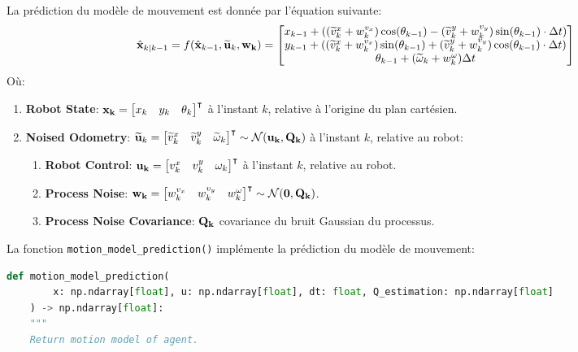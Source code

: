 \documentclass[../CSC_5RO12_TA_TP3.tex]{subfiles}
\begin{document}
\begin{definition}
    La prédiction du modèle de mouvement est donnée par l'équation suivante:
    \begin{equation}
        \hat{\bf{x}}_{k|k-1} = f(\hat{\bf{x}}_{k-1}, \widetilde{\bf{u}}_{k}, \bf{w}_{k}) = \begin{bmatrix}
            x_{k-1} + ((\widetilde{v}^{x}_{k} + w^{v_{x}}_{k}) \cos(\theta_{k-1}) - (\widetilde{v}^{y}_{k} + w^{v_{y}}_{k}) \sin(\theta_{k-1}) \cdot \Delta t )\\
            y_{k-1} + ((\widetilde{v}^{x}_{k} + w^{v_{x}}_{k}) \sin(\theta_{k-1}) + (\widetilde{v}^{y}_{k} + w^{v_{y}}_{k}) \cos(\theta_{k-1}) \cdot \Delta t )\\
            \theta_{k-1} + (\widetilde{\omega}_{k} + w^{\omega}_{k}) \Delta t\\
        \end{bmatrix}
    \end{equation}
    Où:
    \begin{enumerate}[noitemsep]
        \item \textbf{Robot State}: $\bf{x}_{k} = \begin{bmatrix} x_{k} & y_{k} & \theta_{k} \end{bmatrix}^{\intercal}$ à l'instant $k$, relative à l'origine du plan cartésien.
        \item \textbf{Noised Odometry}: $\widetilde{\bf{u}}_{k} = \begin{bmatrix} \widetilde{v}^{x}_{k} & \widetilde{v}^{y}_{k} & \widetilde{\omega}_{k} \end{bmatrix}^{\intercal} \sim \mathcal{N}(\bf{u}_{k}, \bf{Q}_{k})$ à l'instant $k$, relative au robot:
        \begin{enumerate}[noitemsep]
            \item \textbf{Robot Control}: $\bf{u}_{k} = \begin{bmatrix} v^{x}_{k} & v^{y}_{k} & \omega_{k} \end{bmatrix}^{\intercal}$ à l'instant $k$, relative au robot.
            \item \textbf{Process Noise}: $\bf{w}_{k} = \begin{bmatrix} w^{v_{x}}_{k} & w^{v_{y}}_{k} & w^{\omega}_{k} \end{bmatrix}^{\intercal} \sim \mathcal{N}(\bf{0}, \bf{Q}_{k})$.
            \item \textbf{Process Noise Covariance}: $\bf{Q}_{k}$ covariance du bruit Gaussian du processus.
        \end{enumerate}
    \end{enumerate}
    La fonction \texttt{motion\_model\_prediction()} implémente la prédiction du modèle de mouvement:
    \begin{scriptsize}\mycode
        \begin{lstlisting}[language=Python, caption=\texttt{motion\_model\_prediction()}]
def motion_model_prediction(
        x: np.ndarray[float], u: np.ndarray[float], dt: float, Q_estimation: np.ndarray[float]
    ) -> np.ndarray[float]:
    """
    Return motion model of agent.


\end{lstlisting}
\end{scriptsize}
\end{definition}
\end{document}
